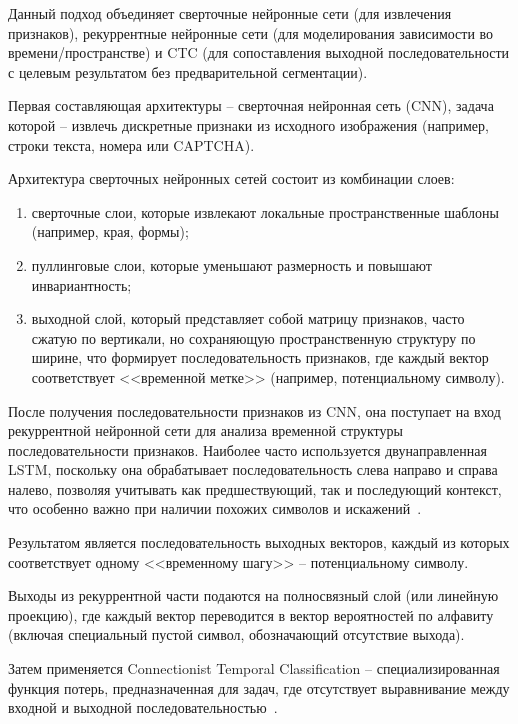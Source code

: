 Данный подход объединяет сверточные нейронные сети (для извлечения признаков), 
рекуррентные нейронные сети (для моделирования зависимости во 
времени/пространстве) и CTC (для сопоставления выходной последовательности с 
целевым результатом без предварительной сегментации).

Первая составляющая архитектуры -- сверточная нейронная сеть (CNN), задача 
которой -- извлечь дискретные признаки из исходного изображения (например, строки 
текста, номера или CAPTCHA).

Архитектура сверточных нейронных сетей состоит из комбинации слоев:

\begin{enumerate}
    \item сверточные слои, которые извлекают локальные пространственные шаблоны 
    (например, края, формы);
    \item пуллинговые слои, которые уменьшают размерность и повышают 
    инвариантность;
    \item выходной слой, который представляет собой матрицу признаков, часто 
    сжатую по вертикали, но сохраняющую пространственную структуру по ширине, 
    что формирует последовательность признаков, где каждый вектор соответствует 
    <<временной метке>> (например, потенциальному символу).
\end{enumerate}

После получения последовательности признаков из CNN, она поступает на вход 
рекуррентной нейронной сети для анализа временной структуры последовательности 
признаков. Наиболее часто используется двунаправленная LSTM, поскольку она 
обрабатывает последовательность слева направо и справа налево, позволяя учитывать 
как предшествующий, так и последующий контекст, что особенно важно при наличии 
похожих символов и искажений~\cite{crnnbook}.

Результатом является последовательность выходных векторов, каждый из которых 
соответствует одному <<временному шагу>> -- потенциальному символу.

Выходы из рекуррентной части подаются на полносвязный слой (или линейную 
проекцию), где каждый вектор переводится в вектор вероятностей по алфавиту 
(включая специальный пустой символ, обозначающий отсутствие выхода).

Затем применяется Connectionist Temporal Classification -- специализированная 
функция потерь, предназначенная для задач, где отсутствует выравнивание между 
входной и выходной последовательностью~\cite{ctc}.

